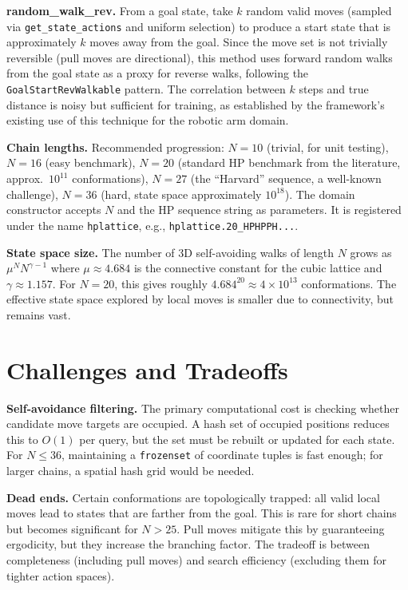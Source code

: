 \documentclass[11pt]{article}
\begin{document}
\textbf{random\_walk\_rev.} From a goal state, take $k$ random valid moves (sampled via \texttt{get\_state\_actions} and uniform selection) to produce a start state that is approximately $k$ moves away from the goal. Since the move set is not trivially reversible (pull moves are directional), this method uses forward random walks from the goal state as a proxy for reverse walks, following the \texttt{GoalStartRevWalkable} pattern. The correlation between $k$ steps and true distance is noisy but sufficient for training, as established by the framework's existing use of this technique for the robotic arm domain.

\textbf{Chain lengths.} Recommended progression: $N = 10$ (trivial, for unit testing), $N = 16$ (easy benchmark), $N = 20$ (standard HP benchmark from the literature, approx.\ $10^{11}$ conformations), $N = 27$ (the ``Harvard'' sequence, a well-known challenge), $N = 36$ (hard, state space approximately $10^{18}$). The domain constructor accepts $N$ and the HP sequence string as parameters. It is registered under the name \texttt{hplattice}, e.g., \texttt{hplattice.20\_HPHPPH...}.

\textbf{State space size.} The number of 3D self-avoiding walks of length $N$ grows as $\mu^N N^{\gamma - 1}$ where $\mu \approx 4.684$ is the connective constant for the cubic lattice and $\gamma \approx 1.157$. For $N = 20$, this gives roughly $4.684^{20} \approx 4 \times 10^{13}$ conformations. The effective state space explored by local moves is smaller due to connectivity, but remains vast.


\section{Challenges and Tradeoffs}

\textbf{Self-avoidance filtering.} The primary computational cost is checking whether candidate move targets are occupied. A hash set of occupied positions reduces this to $O(1)$ per query, but the set must be rebuilt or updated for each state. For $N \leq 36$, maintaining a \texttt{frozenset} of coordinate tuples is fast enough; for larger chains, a spatial hash grid would be needed.

\textbf{Dead ends.} Certain conformations are topologically trapped: all valid local moves lead to states that are farther from the goal. This is rare for short chains but becomes significant for $N > 25$. Pull moves mitigate this by guaranteeing ergodicity, but they increase the branching factor. The tradeoff is between completeness (including pull moves) and search efficiency (excluding them for tighter action spaces).
\end{document}
